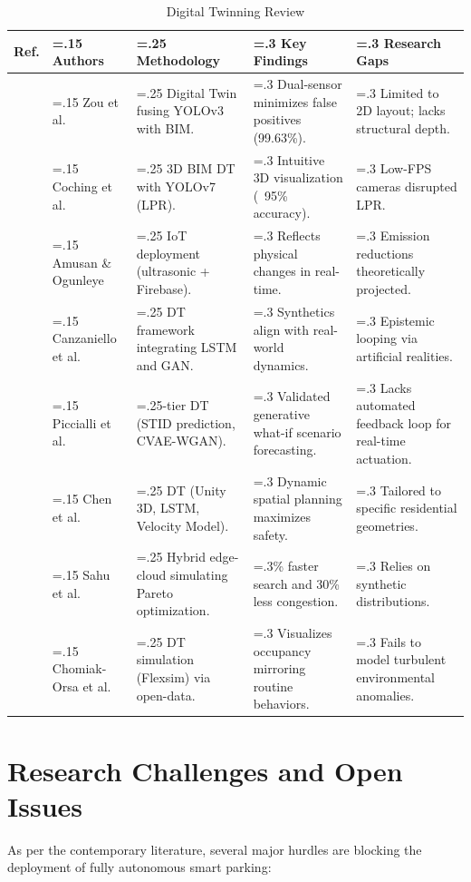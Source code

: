 \documentclass[conference]{IEEEtran}
\begin{document}
\begin{table}[!htbp]
\caption{Digital Twinning Review}
\label{tab:digital_twin}
\centering
\begin{tabularx}{\textwidth}{@{} l >{\hsize=.15\hsize}X >{\hsize=.25\hsize}X >{\hsize=.3\hsize}X >{\hsize=.3\hsize}X @{}}
\toprule
\textbf{Ref.} & \textbf{Authors} & \textbf{Methodology} & \textbf{Key Findings} & \textbf{Research Gaps} \\
\midrule
\cite{b2} & Zou et al. & Digital Twin fusing YOLOv3 with BIM. & Dual-sensor minimizes false positives (99.63\%). & Limited to 2D layout; lacks structural depth. \\
\cite{b13} & Coching et al. & 3D BIM DT with YOLOv7 (LPR). & Intuitive 3D visualization (~95\% accuracy). & Low-FPS cameras disrupted LPR. \\
\cite{b3} & Amusan \& Ogunleye & IoT deployment (ultrasonic + Firebase). & Reflects physical changes in real-time. & Emission reductions theoretically projected. \\
\cite{b20} & Canzaniello et al. & DT framework integrating LSTM and GAN. & Synthetics align with real-world dynamics. & Epistemic looping via artificial realities. \\
\cite{b1} & Piccialli et al. & 3-tier DT (STID prediction, CVAE-WGAN). & Validated generative what-if scenario forecasting. & Lacks automated feedback loop for real-time actuation. \\
\cite{b19} & Chen et al. & DT (Unity 3D, LSTM, Velocity Model). & Dynamic spatial planning maximizes safety. & Tailored to specific residential geometries. \\
\cite{b4} & Sahu et al. & Hybrid edge-cloud simulating Pareto optimization. & 25\% faster search and 30\% less congestion. & Relies on synthetic distributions. \\
\cite{b38} & Chomiak-Orsa et al. & DT simulation (Flexsim) via open-data. & Visualizes occupancy mirroring routine behaviors. & Fails to model turbulent environmental anomalies. \\
\bottomrule
\end{tabularx}
\end{table}

\section{Research Challenges and Open Issues}
As per the contemporary literature, several major hurdles are blocking the deployment of fully autonomous smart parking: 
\end{document}
